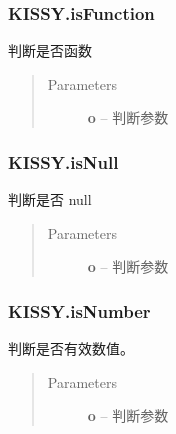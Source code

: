 \documentclass[letterpaper,10pt,english]{sphinxmanual}
\begin{document}
\subsubsection{KISSY.isFunction}
\label{api/seed/lang/isFunction:kissy-isfunction}\label{api/seed/lang/isFunction::doc}

\begin{fulllineitems}
\label{api/seed/lang/isFunction:Lang.KISSY.isFunction}
判断是否函数
\begin{quote}\begin{description}
\item[{Parameters}] \leavevmode
\textbf{o} -- 判断参数

\end{description}\end{quote}

\end{fulllineitems}



\subsubsection{KISSY.isNull}
\label{api/seed/lang/isNull:kissy-isnull}\label{api/seed/lang/isNull::doc}

\begin{fulllineitems}
\label{api/seed/lang/isNull:Lang.KISSY.isNull}
判断是否 null
\begin{quote}\begin{description}
\item[{Parameters}] \leavevmode
\textbf{o} -- 判断参数

\end{description}\end{quote}

\end{fulllineitems}



\subsubsection{KISSY.isNumber}
\label{api/seed/lang/isNumber::doc}\label{api/seed/lang/isNumber:kissy-isnumber}

\begin{fulllineitems}
\label{api/seed/lang/isNumber:Lang.KISSY.isNumber}
判断是否有效数值。
\begin{quote}\begin{description}
\item[{Parameters}] \leavevmode
\textbf{o} -- 判断参数

\end{description}\end{quote}

\end{fulllineitems}
\end{document}
